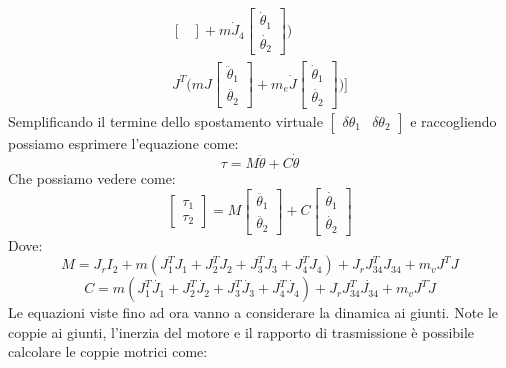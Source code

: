 \begin{equation*}
\begin{split}
\begin{bmatrix}
\end{bmatrix}+m\dot{J}_4 \begin{bmatrix}
\dot{\theta}_1 \\ \dot{\theta_2}
\end{bmatrix} \bigg) \\ J^T \bigg( mJ\begin{bmatrix}
\ddot{\theta}_1 \\ \ddot{\theta_2}
\end{bmatrix}+m_e\dot{J} \begin{bmatrix}
\dot{\theta}_1 \\ \dot{\theta_2}
\end{bmatrix} \bigg)\Bigg]
\end{split} 
\end{equation*}
Semplificando il termine dello spostamento virtuale $\begin{bmatrix}
	\delta \theta_1 & \delta \theta_2
\end{bmatrix}$ e raccogliendo possiamo esprimere l'equazione come:
\begin{equation}
    \tau = M \ddot{\theta} + C \dot{\theta}
    \label{eq:dinamicaInv}
\end{equation}
Che possiamo vedere come:
\begin{equation}
    \begin{bmatrix}
    \tau_1 \\ \tau_2
    \end{bmatrix} = 
    M\begin{bmatrix}
    \ddot{\theta_1} \\ \ddot{\theta_2}
    \end{bmatrix}
    + C \begin{bmatrix}
    \dot{\theta_1} \\ \dot{\theta_2}
    \end{bmatrix}
\end{equation}
Dove:
\begin{equation}
    M = J_r I_2 + m(J_1^T J_1 + J_2^TJ_2+J_3^TJ_3+J_4^TJ_4)+J_rJ_{34}^TJ_{34} + m_vJ^TJ
    \label{eq:M}
\end{equation}
\begin{equation}
    C = m(J_1^T\dot{J_1}+J_2^T\dot{J_2}+J_3^T\dot{J_3}+J_4^T\dot{J_4})+J_rJ_{34}^T\dot{J_{34}}+m_vJ^T\dot{J}
    \label{eq:K}
\end{equation}
Le equazioni viste fino ad ora vanno a considerare la dinamica ai giunti. Note le coppie ai giunti, l'inerzia del motore e il rapporto di trasmissione è possibile calcolare le coppie motrici come:
